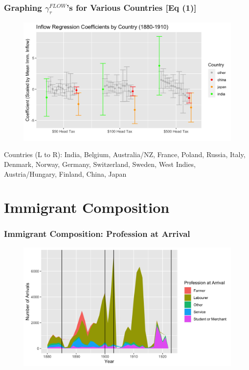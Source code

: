\documentclass[pdf]{beamer}
\begin{document}
\begin{frame}[label = country_regs]
    \frametitle{Graphing $\gamma^{FLOW}_\tau$'s for Various Countries [Eq (1)]}
    \begin{figure}
        \includegraphics[width = \textwidth]{../../figs/8aug23/reg_coefs.png}
    \end{figure}
    \scriptsize
    Countries (L to R): India, Belgium, Australia/NZ, France, Poland, Russia, Italy, Denmark, Norway, Germany, Switzerland, Sweden, West Indies, Austria/Hungary, Finland, China, Japan
\end{frame}

%             

\section{Immigrant Composition}
\begin{frame}[label = occ_n]
    \frametitle{Immigrant Composition: Profession at Arrival}
    \begin{figure}
        \includegraphics[width = \textwidth]{../../figs/8aug23/occgrp_n.png}
    \end{figure}
    \hyperlink{occ_pct}{}
\end{frame}
\end{document}
